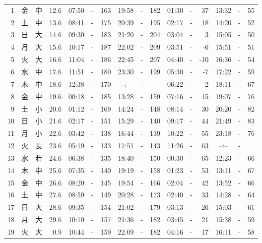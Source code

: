 \documentclass[12pt.a4j]{jsarticle}
\begin{document}
\begin{center}
\begin{table}[ht]
\begin{tabular}{|rc|cr|ccrccr|ccrccr|}
 \hline
 1 & 金 & 中 & 12.6 &  07:50 &-& 163  &  19:58 &-& 182  &   01:30 &-&  37  &   13:32 &-&  55  \\
 2 & 土 & 中 & 13.6 &  08:41 &-& 175  &  20:39 &-& 195  &   02:17 &-&  18  &   14:20 &-&  52  \\
 3 & 日 & 大 & 14.6 &  09:30 &-& 183  &  21:20 &-& 204  &   03:04 &-&   3  &   15:05 &-&  50  \\
 4 & 月 & 大 & 15.6 &  10:17 &-& 187  &  22:02 &-& 209  &   03:51 &-&  -6  &   15:51 &-&  51  \\
 5 & 火 & 大 & 16.6 &  11:04 &-& 186  &  22:45 &-& 207  &   04:40 &-& -10  &   16:36 &-&  54  \\
 6 & 水 & 中 & 17.6 &  11:51 &-& 180  &  23:30 &-& 199  &   05:30 &-&  -7  &   17:22 &-&  59  \\
 7 & 木 & 中 & 18.6 &  12:38 &-& 170  &  --:-- &-&     &   06:22 &-&   2  &   18:11 &-&  67  \\
 8 & 金 & 中 & 19.6 &  00:18 &-& 185  &  13:28 &-& 159  &   07:16 &-&  15  &   19:07 &-&  76  \\
 9 & 土 & 小 & 20.6 &  01:12 &-& 169  &  14:24 &-& 148  &   08:14 &-&  30  &   20:20 &-&  82  \\
10 & 日 & 小 & 21.6 &  02:17 &-& 151  &  15:29 &-& 140  &   09:17 &-&  44  &   21:49 &-&  83  \\
11 & 月 & 小 & 22.6 &  03:42 &-& 138  &  16:44 &-& 139  &   10:22 &-&  55  &   23:18 &-&  76  \\
12 & 火 & 長 & 23.6 &  05:19 &-& 133  &  17:51 &-& 143  &   11:26 &-&  63  &   --:-- &-&     \\
13 & 水 & 若 & 24.6 &  06:38 &-& 135  &  18:40 &-& 150  &   00:30 &-&  65  &   12:23 &-&  66  \\
14 & 木 & 中 & 25.6 &  07:35 &-& 140  &  19:19 &-& 158  &   01:23 &-&  53  &   13:11 &-&  67  \\
15 & 金 & 中 & 26.6 &  08:20 &-& 145  &  19:54 &-& 166  &   02:04 &-&  42  &   13:52 &-&  66  \\
16 & 土 & 中 & 27.6 &  08:59 &-& 149  &  20:28 &-& 173  &   02:40 &-&  33  &   14:28 &-&  64  \\
17 & 日 & 大 & 28.6 &  09:35 &-& 154  &  21:02 &-& 179  &   03:13 &-&  26  &   15:03 &-&  61  \\
18 & 月 & 大 & 29.6 &  10:10 &-& 157  &  21:36 &-& 182  &   03:45 &-&  21  &   15:38 &-&  59  \\
19 & 火 & 大 &  0.9 &  10:44 &-& 159  &  22:09 &-& 182  &   04:16 &-&  17  &   16:11 &-&  58  \\

\end{tabular}
\end{table}
\end{center}
\end{document}

